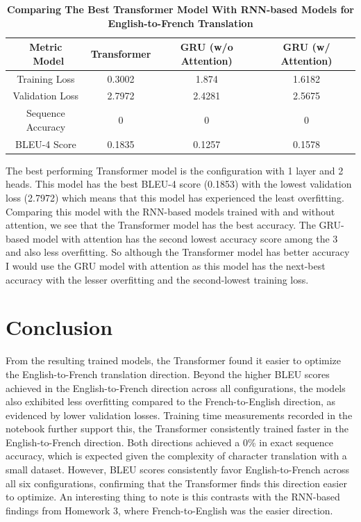 \documentclass[a4paper]{article}
\begin{document}
\begin{table}[H]
    \centering
    \caption{\textbf{Comparing The Best Transformer Model With RNN-based Models for English-to-French Translation}}
    \label{tab:fra2engComp}
    \begin{tabular}{| c || c | c | c |}
        \hline
        Metric \ Model & Transformer & GRU (w/o Attention) & GRU (w/ Attention) \\
        \hline
        Training Loss & 0.3002 & 1.874 & 1.6182 \\
        \hline
        Validation Loss & 2.7972 & 2.4281 & 2.5675 \\
        \hline
        Sequence Accuracy & 0 & 0 & 0 \\
        \hline
        BLEU-4 Score & 0.1835 & 0.1257 & 0.1578 \\
        \hline 
    \end{tabular}
\end{table}

The best performing Transformer model is the configuration with 1 layer and 2 heads. This model has the best BLEU-4 score (0.1853) with the lowest validation loss (2.7972) which means that this model has experienced the least overfitting. Comparing this model with the RNN-based models trained with and without attention, we see that the Transformer model has the best accuracy. The GRU-based model with attention has the second lowest accuracy score among the 3 and also less overfitting. So although the Transformer model has better accuracy I would use the GRU model with attention as this model has the next-best accuracy with the lesser overfitting and the second-lowest training loss.

\section*{\textbf{Conclusion}}
From the resulting trained models, the Transformer found it easier to optimize the English-to-French translation direction. Beyond the higher BLEU scores achieved in the English-to-French direction across all configurations, the models also exhibited less overfitting compared to the French-to-English direction, as evidenced by lower validation losses. Training time measurements recorded in the notebook further support this, the Transformer consistently trained faster in the English-to-French direction. Both directions achieved a 0\% in exact sequence accuracy, which is expected given the complexity of character translation with a small dataset. However, BLEU scores consistently favor English-to-French across all six configurations, confirming that the Transformer finds this direction easier to optimize. An interesting thing to note is this contrasts with the RNN-based findings from Homework 3, where French-to-English was the easier direction.
\end{document}
